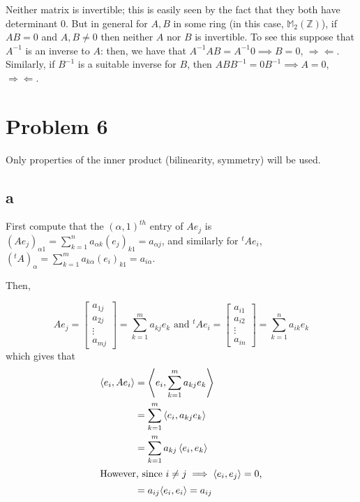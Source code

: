 \documentclass[12pt,letterpaper]{article}
\theoremstyle{definition}
\newcommand{\contra}{\Rightarrow\!\Leftarrow}
\newcommand{\Z}{\mathbb{Z}}
\begin{document}
Neither matrix is invertible; this is easily seen by the fact that they both
have determinant $0$. But in general for $A, B$ in some ring (in this case,
$\mathbb{M}_2(\Z)$), if $AB = 0$ and $A, B \neq 0$ then neither
$A$ nor $B$ is invertible. To see this suppose that $A^{-1}$ is an inverse to
$A$: then, we have that $A^{-1}AB = A^{-1}0 \implies B = 0$, $\contra$.
Similarly, if $B^{-1}$ is a suitable inverse for $B$, then $ABB^{-1} = 0B^{-1}
\implies A = 0$, $\contra$.

\section*{Problem 6}

Only properties of the inner product (bilinearity, symmetry) will be used.

\subsection*{a}

First compute that the $(\alpha,1)^{th}$ entry of $Ae_j$ is
$(Ae_j)_{\alpha 1} = \sum_{k=1}^n a_{\alpha k}(e_j)_{k1} = a_{\alpha j}$, and
similarly for $^tAe_i$, $({^tA})_\alpha = \sum_{k=1}^m a_{k \alpha}(e_i)_{k1} =
a_{i\alpha}$.

Then,

\[
  Ae_j =
  \begin{bmatrix}
    a_{1j} \\
    a_{2j} \\
    \vdots \\
    a_{mj}
  \end{bmatrix} =
  \sum_{k=1}^m a_{kj}e_k \text{ and }
  {^tAe_i} = 
  \begin{bmatrix}
    a_{i1} \\
    a_{i2} \\
    \vdots \\
    a_{in}
  \end{bmatrix} = 
  \sum_{k=1}^n a_{ik}e_k
\]
which gives that
\begin{align*}
  \left\langle e_i, Ae_i \right\rangle &= \left\langle e_i, \sum_{k=1}^m a_{kj}e_k \right\rangle \\
                            &= \sum_{k=1}^m \left\langle e_i, a_{kj}e_k \right\rangle \\
                            &= \sum_{k=1}^m a_{kj} \left\langle e_i, e_k \right\rangle \\
                            \intertext{However, since $i \neq j \implies
                            \left\langle e_i, e_j \right\rangle = 0$,}
                            &= a_{ij}\langle e_i, e_i \rangle = a_{ij}
\end{align*}
\end{document}
